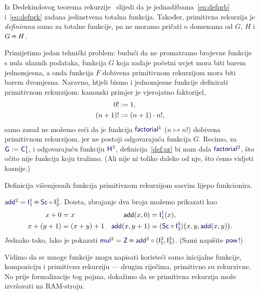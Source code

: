 \begin{napomena}[{name=[ulazi i izlaz primitivne rekurzije su totalne funkcije]}]\label{nap:prtot}
Iz Dedekindovog teorema rekurzije~\cite{skr:VukTS} slijedi da je jednadžbama~\eqref{eq:defprb} i~\eqref{eq:defprk} zadana jedinstvena totalna funkcija. Također, primitivna rekurzija je \emph{definirana} samo za totalne funkcije, pa ne moramo pričati o domenama od $G$, $H$ i $G\pr H$.
\end{napomena}

Primijetimo jedan tehnički problem: budući da ne promatramo brojevne funkcije s nula ulaznih podataka, funkcija $G$ koja zadaje početni uvjet mora biti barem jednomjesna, a onda funkcija $F$ dobivena primitivnom rekurzijom mora biti barem dvomjesna. Naravno, htjeli bismo i jednomjesne funkcije definirati primitivnom rekurzijom: kanonski primjer je vjerojatno faktorijel,
\begin{align}
\label{eq:faktb}
    0!&:=1\text,\\
\label{eq:faktk}
    (n+1)!&:=(n+1)\cdot n!\text,
\end{align}
samo zasad ne možemo reći da je funkcija $\f{factorial}^1$ ($n\mapsto n!$) dobivena primitivnom rekurzijom, jer ne postoji odgovarajuća funkcija $G$. Recimo, za $\f G:=\f C_1^1$, i odgovarajuću funkciju $\f H^3$, definicija~\ref{def:pr} bi nam dala $\f{factorial}^2$, što očito nije funkcija koju tražimo. (Ali nije ni toliko daleko od nje, što ćemo vidjeti kasnije.)

Definicija višemjesnih funkcija primitivnom rekurzijom sasvim lijepo funkcionira.

\begin{primjer}[{name=[{zbrajanje, množenje i potenciranje primitivnom rekurzijom}]}]\label{pr:addmulpow}
$\f{add}^2=\f I_1^1\pr\f{Sc}\circ\f I_3^3$. Doista, zbrajanje dva broja možemo prikazati kao
\begin{align}
\label{eq:addb}
    x+0&=x & \f{add}(x,0)&=\f I_1^1(x),\\
\label{eq:addk}
    x+(y+1)&=(x+y)+1 &\f{add}(x,y+1)&=(\f{Sc}\circ\f I_3^3)\bigl(x,y,\f{add}(x,y)\bigr).
\end{align}
Jednako tako, lako je pokazati $\f{mul}^2=\f Z\pr\f{add}^2\circ(\f I_1^3,\f I_3^3)$. (Sami napišite $\f{pow}$!)
\end{primjer}

Vidimo da se mnoge funkcije mogu napisati koristeći samo inicijalne funkcije, kompoziciju i primitivnu rekurziju --- drugim riječima, primitivno su rekurzivne. No prije formalizacije tog pojma, dokažimo da se primitivna rekurzija može izvršavati na RAM-stroju.


